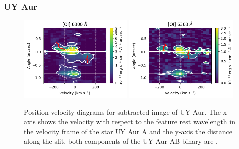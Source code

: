 \documentclass[twocolumn,trackchanges]{aastex63}
\begin{document}
\subsubsection{UY Aur}
\begin{figure}[h!]
\begin{center}
\includegraphics[width=0.49\textwidth]{UY_Aur_6300.png}
\includegraphics[width=0.49\textwidth]{UY_Aur_6363.png}
\caption{Position velocity diagrams for subtracted
image of UY Aur.  The x-axis shows the velocity with respect to the
feature rest wavelength in the velocity frame of the star UY Aur
A and the y-axis the distance along the slit.  both components of the UY Aur AB
binary are .
\label{fig:UYAur}
}
\end{center}
\end{figure}
\end{document}
